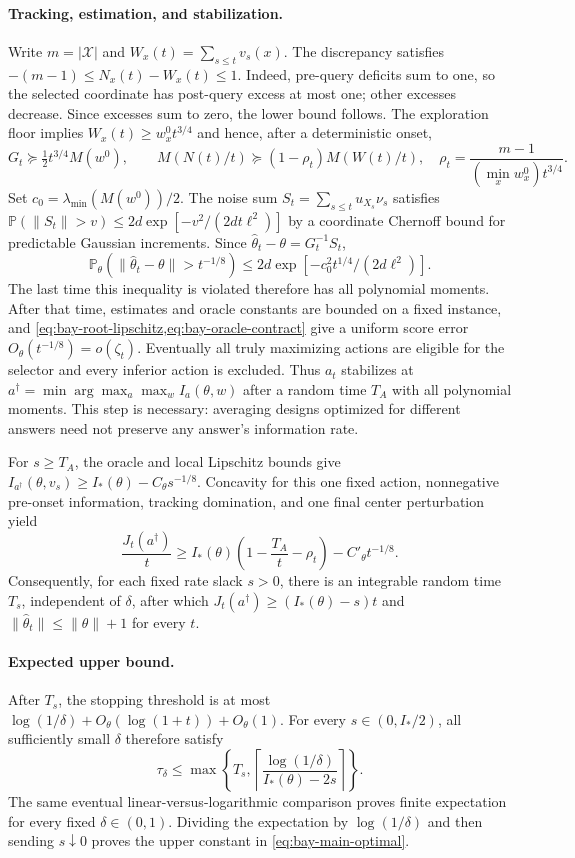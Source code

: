 \documentclass{article}
\theoremstyle{plain}
\theoremstyle{definition}
\begin{document}
\paragraph{Tracking, estimation, and stabilization.}
Write $m=|\mathcal X|$ and $W_x(t)=\sum_{s\le t}v_s(x)$.
The discrepancy satisfies
$-(m-1)\le N_x(t)-W_x(t)\le1$.  Indeed, pre-query deficits sum to one,
so the selected coordinate has post-query excess at most one; other
excesses decrease.  Since excesses sum to zero, the lower bound follows.
The exploration floor implies $W_x(t)\ge w_x^0t^{3/4}$ and hence,
after a deterministic onset,
\[
 G_t\succeq\tfrac12t^{3/4}M(w^0),\qquad
 M(N(t)/t)\succeq(1-\rho_t)M(W(t)/t),\quad
 \rho_t=\frac{m-1}{(\min_xw_x^0)t^{3/4}}.
\]
Set $c_0=\lambda_{\min}(M(w^0))/2$.
The noise sum $S_t=\sum_{s\le t}u_{X_s}\nu_s$ satisfies
$\mathbb P(\|S_t\|>v)\le2d\exp[-v^2/(2dt\ell^2)]$ by a coordinate
Chernoff bound for predictable Gaussian increments.  Since
$\widehat\theta_t-\theta=G_t^{-1}S_t$,
\[
 \mathbb P_\theta(\|\widehat\theta_t-\theta\|>t^{-1/8})
 \le2d\exp[-c_0^2t^{1/4}/(2d\ell^2)].
\]
The last time this inequality is violated therefore has all polynomial
moments.  After that time, estimates and oracle constants are bounded
on a fixed instance, and \cref{eq:bay-root-lipschitz,eq:bay-oracle-contract}
give a uniform score error $O_\theta(t^{-1/8})=o(\zeta_t)$.
Eventually all truly maximizing actions are eligible for the selector
and every inferior action is excluded.  Thus $a_t$ stabilizes at
$a^\dagger=\min\arg\max_a\max_wI_a(\theta,w)$ after a random time
$T_A$ with all polynomial moments.  This step is necessary: averaging
designs optimized for different answers need not preserve any answer's
information rate.

For $s\ge T_A$, the oracle and local Lipschitz bounds give
$I_{a^\dagger}(\theta,v_s)\ge I_*(\theta)-C_\theta s^{-1/8}$.
Concavity for this one fixed action, nonnegative pre-onset information,
tracking domination, and one final center perturbation yield
\begin{equation}
 \frac{J_t(a^\dagger)}t\ge I_*(\theta)
       \left(1-\frac{T_A}{t}-\rho_t\right)-C'_\theta t^{-1/8}.
 \label{eq:bay-information-growth}
\end{equation}
Consequently, for each fixed rate slack $s>0$, there is an integrable
random time $T_s$, independent of $\delta$, after which
$J_t(a^\dagger)\ge(I_*(\theta)-s)t$ and
$\|\widehat\theta_t\|\le\|\theta\|+1$ for every $t$.

\paragraph{Expected upper bound.}
After $T_s$, the stopping threshold is at most
$\log(1/\delta)+O_\theta(\log(1+t))+O_\theta(1)$.
For every $s\in(0,I_*/2)$, all sufficiently small $\delta$ therefore
satisfy
\[
 \tau_\delta\le
 \max\left\{T_s,
 \left\lceil\frac{\log(1/\delta)}{I_*(\theta)-2s}\right\rceil\right\}.
\]
The same eventual linear-versus-logarithmic comparison proves finite
expectation for every fixed $\delta\in(0,1)$.  Dividing the expectation
by $\log(1/\delta)$ and then sending $s\downarrow0$ proves the upper
constant in \cref{eq:bay-main-optimal}.
\end{document}
